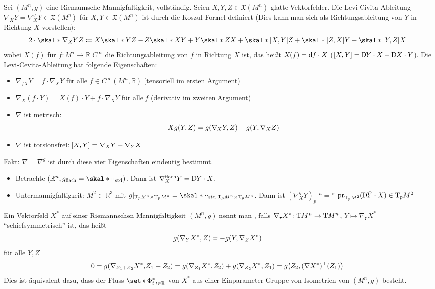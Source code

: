 \begin{erinnerung}
	Sei $(M^n,g)$ eine Riemannsche Mannigfaltigkeit, vollständig.
	Seien $X,Y,Z \in \mathfrak{X}(M^n)$ glatte Vektorfelder.
	Die Levi-Civita-Ableitung $\nabla_X Y = \nabla^g_X Y \in \mathfrak{X}(M^n)$ für $X,Y \in \mathfrak{X}(M^n)$ ist durch die Koszul-Formel definiert (Dies kann man sich als Richtungsableitung von $Y$ in Richtung $X$ vorstellen):
	\[
		2 \cdot \skal*{\nabla_X Y}{Z} \coloneqq X \skal*{Y}{Z} - Z \skal*{X}{Y} + Y \skal*{Z}{X} + \skal*{\benbrace*{X,Y}}{Z} + \skal*{\benbrace*{Z,X}}{Y} - \skal*{\benbrace*{Y,Z}}{X}
	\]
	wobei $X(f)$ für $f \colon M^n \to \mathbb{R}$ $C^\infty$ die Richtungsableitung von $f$ in Richtung $X$ ist, das heißt $X(f) = \mathd f \cdot X$ ($\benbrace*{X,Y} = \D Y \cdot X - \D X \cdot Y$).
	Die Levi-Cevita-Ableitung hat folgende Eigenschaften:
	\begin{itemize}
		\item $\nabla_{f X} Y = f \cdot \nabla_X Y$ für alle $f \in C^\infty(M^n,\mathbb{R})$ (tensoriell im ersten Argument)
		\item $\nabla_X(f \cdot Y) = X(f) \cdot Y + f \cdot \nabla_X Y $ für alle $f$ (derivativ im zweiten Argument)
		\item $\nabla$ ist metrisch:
		\[
			X g(Y,Z) = g \enbrace*{\nabla_X Y,Z} + g \enbrace*{Y,\nabla_X Z}
		\]
		\item $\nabla$ ist torsionsfrei: $\benbrace*{X,Y} = \nabla_X Y - \nabla_Y X$
	\end{itemize}
	Fakt: $\nabla=\nabla^g$ ist durch diese vier Eigenschaften eindeutig bestimmt.
\end{erinnerung}

\begin{beispiel*}
	\begin{itemize}
		\item Betrachte $(\mathbb{R}^n,g_\mathrm{flach} = \skal*{\cdot}{\cdot}_\mathrm{std})$.
		Dann ist $\nabla^\mathrm{flach}_X Y = \D Y \cdot X$.
		\item Untermannigfaltigkeit: $M^2 \subset \mathbb{R}^3$ mit $g |_{\Tmap_p M^n \times \Tmap_p M^n} = \skal*{\cdot }{\cdot }_\mathrm{std} |_{\Tmap_p M^n \times \Tmap_p M^n}$.
		Dann ist $(\nabla_X^g Y)_p$ \enquote{$=$} $\pr_{\Tmap_p M^2}(\D \hat{Y} \cdot X) \in \Tmap_pM^2$
	\end{itemize}
\end{beispiel*}

\begin{erinnerung}
	Ein Vektorfeld $X^*$ auf einer Riemannschen Mannigfaltigkeit $(M^n,g)$ nennt man , falls $\nabla_\bullet X^* \colon \Tmap M^n \to \Tmap M^n$, $Y \mapsto \nabla_Y X^*$ \enquote{schiefsymmetrisch} ist, das heißt
	\[
		g \enbrace*{\nabla_Y X^*,Z} = - g \enbrace*{Y,\nabla_Z X^*}
	\]
	für alle $Y,Z$
	\[
		0 = g \enbrace*{\nabla_{Z_1 + Z_2}X^*,Z_1 + Z_2} = g \enbrace*{\nabla_{Z_1} X^*,Z_2} + g \enbrace*{\nabla_{Z_2} X^*, Z_1} = g \enbrace*{Z_2, (\nabla X^*)^\perp (Z_1)}
	\]
	Dies ist äquivalent dazu, dass der Fluss $\set*{\Phi_t^*}_{t \in \mathbb{R}}$ von $X^*$ aus einer Einparameter-Gruppe von Isometrien von $(M^n,g)$ besteht.
\end{erinnerung}

